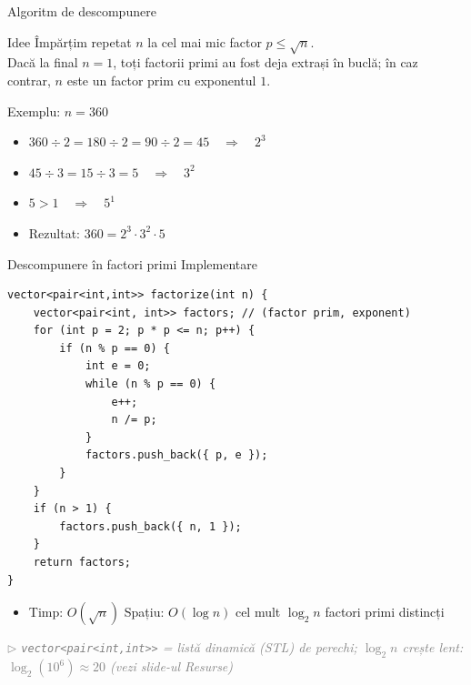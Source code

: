 \documentclass{beamer}
\newcommand{\beginnote}[1]{%
  \vfill
  {\footnotesize\textcolor{gray}{\textit{$\triangleright$ #1 (vezi slide-ul \emph{Resurse})}}}%
}
\begin{document}
\begin{frame}{Algoritm de descompunere}
  \begin{block}{Idee}
    Împărțim repetat $n$ la cel mai mic factor $p \leq \sqrt{n}$. \\
    Dacă la final $n = 1$, toți factorii primi au fost deja extrași în buclă; în caz contrar, $n$ este un factor prim cu exponentul $1$. \\
  \end{block}
  \bigskip
  Exemplu: $n = 360$
  \begin{itemize}
    \item $360 \div 2 = 180 \div 2 = 90 \div 2 = 45 \quad\Rightarrow\quad 2^3$
    \item $45 \div 3 = 15 \div 3 = 5 \quad\Rightarrow\quad 3^2$
    \item $5 > 1 \quad\Rightarrow\quad 5^1$
    \item Rezultat: $360 = 2^3 \cdot 3^2 \cdot 5$
  \end{itemize}
\end{frame}

\begin{frame}{Descompunere în factori primi \textemdash{} Implementare}
  \begin{lstlisting}
vector<pair<int,int>> factorize(int n) {
    vector<pair<int, int>> factors; // (factor prim, exponent)
    for (int p = 2; p * p <= n; p++) {
        if (n % p == 0) {
            int e = 0;
            while (n % p == 0) {
                e++;
                n /= p;
            }
            factors.push_back({ p, e });
        }
    }
    if (n > 1) {
        factors.push_back({ n, 1 });
    }
    return factors;
}
  \end{lstlisting}
  \begin{itemize}
    \item Timp: $O(\sqrt{n})$ \quad Spațiu: $O(\log n)$ \textemdash{} cel mult $\log_2 n$ factori primi distincți
  \end{itemize}
  \beginnote{\lstinline|vector<pair<int,int>>| = listă dinamică (STL) de perechi; $\log_2 n$ crește lent: $\log_2(10^6)\approx 20$}
\end{frame}
\end{document}
